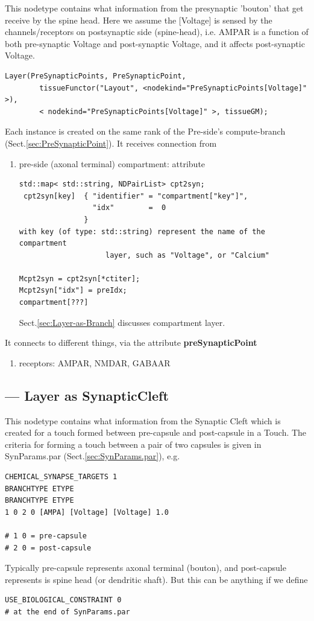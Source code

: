 This nodetype contains what information from the presynaptic 'bouton' that get
receive by the spine head. Here we assume the [Voltage] is sensed by the
channels/receptors on postsynaptic side (spine-head), i.e. AMPAR is a function
of both pre-synaptic Voltage and post-synaptic Voltage, and it affects
post-synaptic Voltage.

\begin{verbatim}
Layer(PreSynapticPoints, PreSynapticPoint, 
        tissueFunctor("Layout", <nodekind="PreSynapticPoints[Voltage]" >), 
        < nodekind="PreSynapticPoints[Voltage]" >, tissueGM);
\end{verbatim}

Each instance is created on the same rank of the Pre-side's compute-branch
(Sect.\ref{sec:PreSynapticPoint}).
It receives connection from 
\begin{enumerate}
  \item pre-side (axonal terminal) compartment: attribute
  
\begin{verbatim}
std::map< std::string, NDPairList> cpt2syn;   
 cpt2syn[key]  { "identifier" = "compartment["key"]",
                 "idx"        =  0
               }
with key (of type: std::string) represent the name of the compartment
                    layer, such as "Voltage", or "Calcium"

Mcpt2syn = cpt2syn[*ctiter];
Mcpt2syn["idx"] = preIdx; 
compartment[???]
\end{verbatim}
Sect.\ref{sec:Layer-as-Branch} discusses compartment layer.

\end{enumerate}

It connects to different things, via the attribute {\bf preSynapticPoint}
\begin{enumerate}
  \item receptors: AMPAR, NMDAR, GABAAR
\end{enumerate}

\subsection{--- Layer as SynapticCleft}
\label{sec:Layer-as-SynapticCleft}

This nodetype contains what information from the Synaptic Cleft which is
created for a touch formed between pre-capsule and post-capsule in a Touch.
The criteria for forming a touch between a pair of two capsules is given in
SynParams.par (Sect.\ref{sec:SynParams.par}), e.g.
\begin{verbatim}
CHEMICAL_SYNAPSE_TARGETS 1
BRANCHTYPE ETYPE
BRANCHTYPE ETYPE
1 0 2 0 [AMPA] [Voltage] [Voltage] 1.0

# 1 0 = pre-capsule
# 2 0 = post-capsule
\end{verbatim}
Typically pre-capsule represents axonal terminal (bouton), and 
post-capsule represents is spine head (or dendritic
shaft). But this can be anything if we define
\begin{verbatim}
USE_BIOLOGICAL_CONSTRAINT 0
# at the end of SynParams.par
\end{verbatim} 

